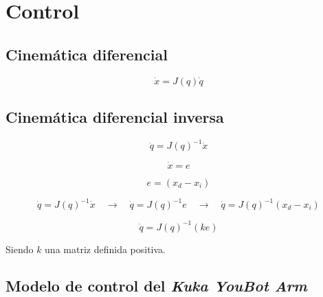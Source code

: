 \sffamily\large\justify

\section{Control}

\subsection{Cinemática diferencial}

\begin{equation*}
    \dot{x} = J(q) \dot{q}
\end{equation*}

\subsection{Cinemática diferencial inversa}

\begin{equation*}
    \dot{q} = J(q)^{-1}\dot{x}
\end{equation*}

\begin{equation*}
    \dot{x} = e
\end{equation*}

\begin{equation*}
    e = (x_d - x_i)
\end{equation*}

\begin{equation*}
    \dot{q} = J(q)^{-1}\dot{x} \quad\to\quad \dot{q} = J(q)^{-1}e \quad\to\quad \dot{q} = J(q)^{-1}(x_d-x_i)
\end{equation*}

\begin{equation*}
    \dot{q} = J(q)^{-1} (ke)
\end{equation*}

\hspace{0.5cm} Siendo $k$ una matriz definida positiva.

\subsection{Modelo de control del \emph{Kuka YouBot Arm}}

